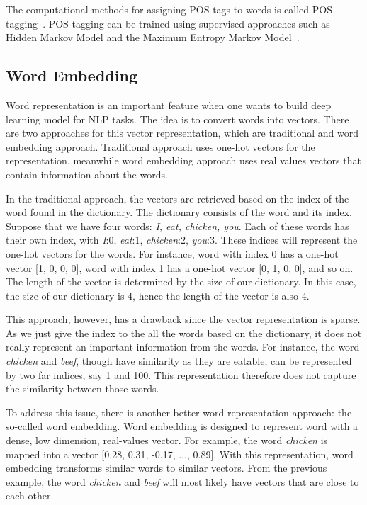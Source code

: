 The computational methods for assigning POS tags to words is called POS tagging~\citep{jurafsky2016speech}. POS tagging can be trained using supervised approaches such as Hidden Markov Model and the Maximum Entropy Markov Model~\citep{jurafsky2016speech}.
 

\subsection{Word Embedding}
Word representation is an important feature when one wants to build deep learning model for NLP tasks. The idea is to convert words into vectors. There are two approaches for this vector representation, which are traditional and word embedding approach. Traditional approach uses one-hot vectors for the representation, meanwhile word embedding approach uses real values vectors that contain information about the words.

In the traditional approach, the vectors are retrieved based on the index of the word found in the dictionary. The dictionary consists of the word and its index. Suppose that we have four words: \textit{I, eat, chicken, you}. Each of these words has their own index, with \textit{I}:0, \textit{eat}:1, \textit{chicken}:2, \textit{you}:3. These indices will represent the one-hot vectors for the words. For instance, word with index 0 has a one-hot vector [1, 0, 0, 0], word with index 1 has a one-hot vector [0, 1, 0, 0], and so on. The length of the vector is determined by the size of our dictionary. In this case, the size of our dictionary is 4, hence the length of the vector is also 4. 

This approach, however, has a drawback since the vector representation is sparse. As we just give the index to the all the words based on the dictionary, it does not really represent an important information from the words. For instance, the word \textit{chicken} and \textit{beef}, though have similarity as they are eatable, can be represented by two far indices, say 1 and 100. This representation therefore does not capture the similarity between those words. 

To address this issue, there is another better word representation approach: the so-called word embedding. Word embedding is designed to represent word with a dense, low dimension, real-values vector. For example, the word \textit{chicken} is mapped into a vector [0.28, 0.31, -0.17, ..., 0.89]. With this representation, word embedding transforms similar words to similar vectors. From the previous example, the word \textit{chicken} and \textit{beef} will most likely have vectors that are close to each other.

